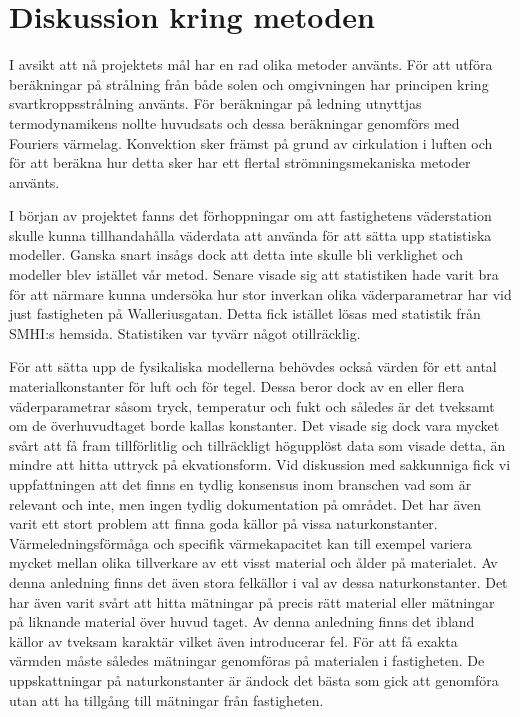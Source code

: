 \section{Diskussion kring metoden}\label{sec:discmethod}

I avsikt att nå projektets mål har en rad olika metoder använts. För att utföra beräkningar på strålning från både solen och
omgivningen har principen kring svartkroppsstrålning använts. För beräkningar på ledning utnyttjas termodynamikens nollte huvudsats
och dessa beräkningar genomförs med Fouriers värmelag. Konvektion sker främst på grund av cirkulation i luften och för att beräkna hur
detta sker har ett flertal strömningsmekaniska metoder använts.

I början av projektet fanns det förhoppningar om att fastighetens väderstation skulle kunna tillhandahålla väderdata att använda för att sätta upp statistiska modeller. 
Ganska snart insågs dock att detta inte skulle bli verklighet och modeller blev istället vår metod. Senare visade sig att statistiken hade
varit bra för att närmare kunna undersöka hur stor inverkan olika väderparametrar har vid just fastigheten på Walleriusgatan. 
Detta fick istället lösas med statistik från SMHI:s hemsida. Statistiken var tyvärr något otillräcklig.

För att sätta upp de fysikaliska modellerna behövdes också värden för ett antal materialkonstanter för luft och för tegel. 
Dessa beror dock av en eller flera väderparametrar såsom tryck, temperatur och fukt och således är det tveksamt om de överhuvudtaget borde kallas konstanter. 
Det visade sig dock vara mycket svårt att få fram tillförlitlig och tillräckligt högupplöst data som visade detta, än mindre att hitta uttryck på ekvationsform.
Vid diskussion med sakkunniga fick vi uppfattningen att det finns en tydlig konsensus inom branschen vad som är relevant och inte, men ingen tydlig dokumentation på området.
Det har även varit ett stort problem att finna goda källor på vissa naturkonstanter. Värmeledningsförmåga och specifik värmekapacitet kan till exempel
variera mycket mellan olika tillverkare av ett visst material och ålder på materialet. Av denna anledning finns det även stora felkällor i val av dessa naturkonstanter. Det har även
varit svårt att hitta mätningar på precis rätt material eller mätningar på liknande material över huvud taget. Av denna anledning finns det ibland
källor av tveksam karaktär vilket även introducerar fel. För att få exakta värmden måste således mätningar genomföras på materialen i fastigheten. De uppskattningar
på naturkonstanter är ändock det bästa som gick att genomföra utan att ha tillgång till mätningar från fastigheten.

